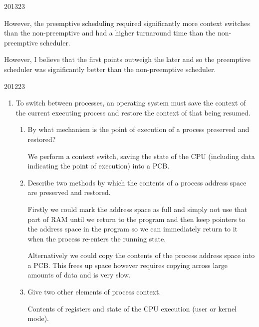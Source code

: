 \documentclass[10pt,\jkfside,a4paper]{article}
\begin{document}
\begin{examquestion}{2013}{2}{3}
\begin{enumerate}
\begin{enumerate}
However, the preemptive scheduling required significantly more context switches than the 
non-preemptive and had a higher turnaround time than the non-preemptive scheduler.

However, I believe that the first points outweigh the later and so the preemptive scheduler 
was significantly better than the non-preemptive scheduler.

\end{enumerate}

\end{enumerate}

\end{examquestion}

\begin{examquestion}{2012}{2}{3}

\begin{enumerate}

\item To switch between processes, an operating system must save the context of the
current executing process and restore the context of that being resumed.

\begin{enumerate}

\item  By what mechanism is the point of execution of a process preserved and
restored?

We perform a context switch, saving the state of the CPU (including data indicating 
the point of execution) into a PCB.

\item  Describe two methods by which the contents of a process address space are
preserved and restored.

Firstly we could mark the address space as full and simply not use that part of RAM 
until we return to the program and then keep pointers to the address space in the program 
so we can immediately return to it when the process re-enters the running state.

Alternatively we could copy the contents of the process address space into a PCB. This 
frees up space however requires copying across large amounts of data and is very slow.

\item Give two other elements of process context.

Contents of registers and state of the CPU execution (user or kernel mode).

\end{enumerate}


\end{enumerate}
\end{examquestion}
\end{document}
